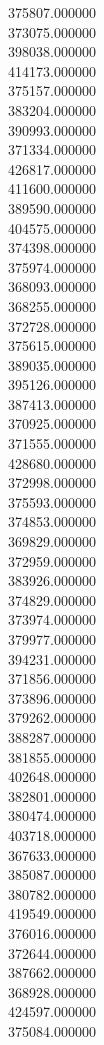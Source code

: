 375807.000000\\
373075.000000\\
398038.000000\\
414173.000000\\
375157.000000\\
383204.000000\\
390993.000000\\
371334.000000\\
426817.000000\\
411600.000000\\
389590.000000\\
404575.000000\\
374398.000000\\
375974.000000\\
368093.000000\\
368255.000000\\
372728.000000\\
375615.000000\\
389035.000000\\
395126.000000\\
387413.000000\\
370925.000000\\
371555.000000\\
428680.000000\\
372998.000000\\
375593.000000\\
374853.000000\\
369829.000000\\
372959.000000\\
383926.000000\\
374829.000000\\
373974.000000\\
379977.000000\\
394231.000000\\
371856.000000\\
373896.000000\\
379262.000000\\
388287.000000\\
381855.000000\\
402648.000000\\
382801.000000\\
380474.000000\\
403718.000000\\
367633.000000\\
385087.000000\\
380782.000000\\
419549.000000\\
376016.000000\\
372644.000000\\
387662.000000\\
368928.000000\\
424597.000000\\
375084.000000\\
